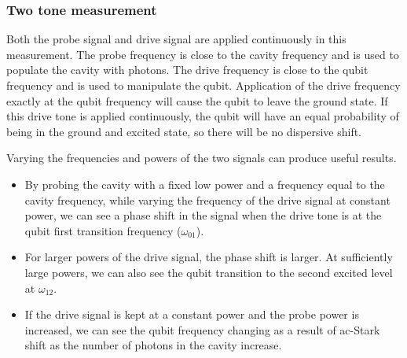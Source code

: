 \subsubsection{Two tone measurement}

Both the probe signal and drive signal are applied continuously in this measurement. The probe frequency is close to the cavity frequency and is used to populate the cavity with photons. The drive frequency is close to the qubit frequency and is used to manipulate the qubit. Application of the drive frequency exactly at the qubit frequency will cause the qubit to leave the ground state. If this drive tone is applied continuously, the qubit will have an equal probability of being in the ground and excited state, so there will be no dispersive shift.

Varying the frequencies and powers of the two signals can produce useful results.
\begin{itemize}
\item By probing the cavity with a fixed low power and a frequency equal to the cavity frequency, while varying the frequency of the drive signal at constant power, we can see a phase shift in the signal when the drive tone is at the qubit first transition frequency ($\omega_{01}$).
\item For larger powers of the drive signal, the phase shift is larger. At sufficiently large powers, we can also see the qubit transition to the second excited level at $\omega_{12}$.
\item If the drive signal is kept at a constant power and the probe power is increased, we can see the qubit frequency changing as a result of ac-Stark shift as the number of photons in the cavity increase.
\end{itemize}